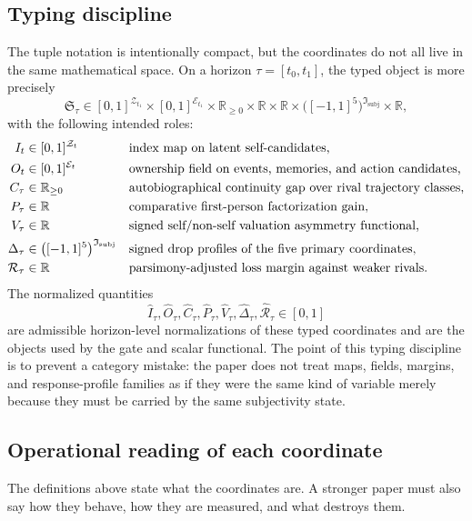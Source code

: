 \documentclass[11pt,a4paper]{article}
\theoremstyle{definition}
\newcommand{\Substate}{\mathfrak{S}}
\newcommand{\IntervFam}{\mathfrak{I}_{\mathrm{subj}}}
\newcommand{\SelfIndex}{I}
\newcommand{\OwnField}{O}
\newcommand{\ContField}{C}
\newcommand{\Persp}{P}
\newcommand{\ValAsym}{V}
\newcommand{\IntervProf}{\Delta}
\newcommand{\Irred}{\mathcal{R}}
\begin{document}
\subsection{Typing discipline}
The tuple notation is intentionally compact, but the coordinates do not all live in the same mathematical space. On a horizon $\tau=[t_0,t_1]$, the typed object is more precisely
\[
\Substate_\tau \in
[0,1]^{\mathcal{Z}_{t_1}}
\times
[0,1]^{\mathcal{E}_{t_1}}
\times
\mathbb{R}_{\ge 0}
\times
\mathbb{R}
\times
\mathbb{R}
\times
\big([-1,1]^5\big)^{\IntervFam}
\times
\mathbb{R},
\]
with the following intended roles:
\begin{align*}
\SelfIndex_t &\in [0,1]^{\mathcal{Z}_t}
&&\text{index map on latent self-candidates,}\\
\OwnField_t &\in [0,1]^{\mathcal{E}_t}
&&\text{ownership field on events, memories, and action candidates,}\\
\ContField_\tau &\in \mathbb{R}_{\ge 0}
&&\text{auto\-bio\-graphical continuity gap over rival trajectory classes,}\\
\Persp_\tau &\in \mathbb{R}
&&\text{comparative first-person factorization gain,}\\
\ValAsym_\tau &\in \mathbb{R}
&&\text{signed self/non-self valuation asymmetry functional,}\\
\IntervProf_\tau &\in \big([-1,1]^5\big)^{\IntervFam}
&&\text{signed drop profiles of the five primary coordinates,}\\
\Irred_\tau &\in \mathbb{R}
&&\text{parsimony-adjusted loss margin against weaker rivals.}
\end{align*}
The normalized quantities
\[
\widehat{\SelfIndex}_\tau,\widehat{\OwnField}_\tau,\widehat{\ContField}_\tau,\widehat{\Persp}_\tau,\widehat{\ValAsym}_\tau,\widehat{\IntervProf}_\tau,\widehat{\Irred}_\tau \in [0,1]
\]
are admissible horizon-level normalizations of these typed coordinates and are the objects used by the gate and scalar functional. The point of this typing discipline is to prevent a category mistake: the paper does not treat maps, fields, margins, and response-profile families as if they were the same kind of variable merely because they must be carried by the same subjectivity state.

\subsection{Operational reading of each coordinate}
The definitions above state what the coordinates are. A stronger paper must also say how they behave, how they are measured, and what destroys them.
\end{document}

